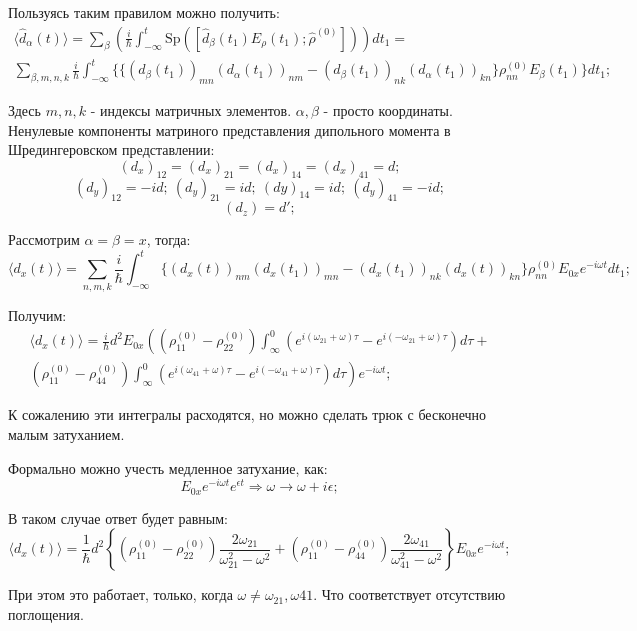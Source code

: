 \documentclass[a4paper, 14pt, russian]{article}
\newcommand{\be}{\begin{equation}}
\newcommand{\ee}{\end{equation}}
\begin{document}
	Пользуясь таким правилом можно получить:
	\begin{multline}
		\langle \hat{d}_\alpha (t) \rangle = \sum_\beta \left(\frac{i}{\hbar}
		\int_{-\infty}^t \text{Sp}([\hat{d}_\beta(t_1) E_\rho(t_1);
		\hat{\rho}^{(0)}])\right) dt_1 = \\
		\sum_{\beta, m, n, k} \frac{i}{\hbar}\int_{-\infty}^t
		\{\{(d_\beta(t_1))_{mn}(d_\alpha(t_1))_{nm} - (d_\beta(t_1))_{nk}(d_\alpha(t_1))_{kn}\}\rho_{nn}^{(0)} E_\beta(t_1)\} dt_1;
	\end{multline}

	Здесь $m, n, k$ - индексы матричных элементов. $\alpha,\beta$ - просто координаты.
	Ненулевые компоненты матриного представления дипольного момента в Шредингеровском представлении:
	\be
		(d_x)_{12} = (d_x)_{21} = (d_x)_{14} = (d_x)_{41} = d;
	\ee
	\be
		(d_y)_{12} = - id;~(d_y)_{21} = id;~(dy)_{14} = id;~(d_y)_{41} = -id;
	\ee
	\be
		(d_z) = d';
	\ee

	Рассмотрим $\alpha  = \beta = x$, тогда:
	\be
		\langle d_x(t)\rangle = \sum_{n, m, k} \frac{i}{\hbar}
		\int_{-\infty}^t \{(d_x(t))_{nm} (d_x(t_1))_{mn} - (d_x(t_1))_{nk} (d_x(t))_{kn}\} \rho_{nn}^{(0)} E_{0x} e^{-i\omega t} dt_1;
	\ee

	Получим:
	\begin{multline}
	\langle d_x(t)\rangle = \frac{i}{\hbar} d^2 E_{0x}\left(
		(\rho_{11}^{(0)} - \rho_{22}^{(0)})\int_{\infty}^0(
		e^{i(\omega_{21} + \omega ) \tau} - e^{i(-\omega_{21}+ \omega)\tau}) d\tau\right. + \\ \left.(\rho_{11}^{(0)} - \rho_{44}^{(0)})\int_{\infty}^0(
			e^{i(\omega_{41} + \omega ) \tau} - e^{i(-\omega_{41}+ \omega)\tau}) d\tau\right) e^{-i\omega t};
	\end{multline}

	К сожалению эти интегралы расходятся, но можно сделать трюк с бесконечно малым затуханием.

	Формально можно учесть медленное затухание, как:
	\be
		E_{0x}e^{-i\omega t} e^{\epsilon t} \Rightarrow \omega \rightarrow \omega + i \epsilon;
	\ee

	В таком случае ответ будет равным:
	\be
		\label{eq195}
		\langle d_x (t) \rangle = \frac{1}{\hbar} d^2 \left\{
			(\rho_{11}^{(0)} - \rho_{22}^{(0)})\frac{2\omega_{21}}{\omega_{21}^2 - \omega^2} + (\rho_{11}^{(0)} - \rho_{44}^{(0)})\frac{2\omega_{41}}{\omega_{41}^2 - \omega^2}\right\} E_{0x} e^{-i\omega t};
	\ee

	При этом это работает, только, когда $\omega \neq \omega_{21},\omega{41}$. Что соответствует
	отсутствию поглощения.
\end{document}
